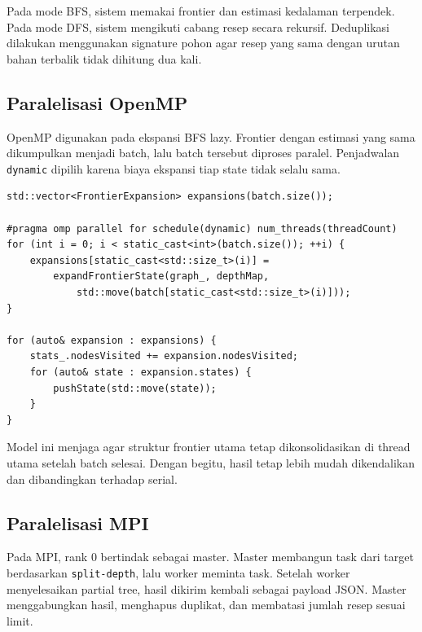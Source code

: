 \documentclass[conference]{IEEEtran}
\begin{document}
Pada mode BFS, sistem memakai frontier dan estimasi kedalaman terpendek. Pada mode DFS, sistem mengikuti cabang resep secara rekursif. Deduplikasi dilakukan menggunakan signature pohon agar resep yang sama dengan urutan bahan terbalik tidak dihitung dua kali.

\subsection{Paralelisasi OpenMP}

OpenMP digunakan pada ekspansi BFS lazy. Frontier dengan estimasi yang sama dikumpulkan menjadi batch, lalu batch tersebut diproses paralel. Penjadwalan \texttt{dynamic} dipilih karena biaya ekspansi tiap state tidak selalu sama.

\begin{lstlisting}[style=cppstyle,caption={Ekspansi batch BFS menggunakan OpenMP.}]
std::vector<FrontierExpansion> expansions(batch.size());

#pragma omp parallel for schedule(dynamic) num_threads(threadCount)
for (int i = 0; i < static_cast<int>(batch.size()); ++i) {
    expansions[static_cast<std::size_t>(i)] =
        expandFrontierState(graph_, depthMap,
            std::move(batch[static_cast<std::size_t>(i)]));
}

for (auto& expansion : expansions) {
    stats_.nodesVisited += expansion.nodesVisited;
    for (auto& state : expansion.states) {
        pushState(std::move(state));
    }
}
\end{lstlisting}

Model ini menjaga agar struktur frontier utama tetap dikonsolidasikan di thread utama setelah batch selesai. Dengan begitu, hasil tetap lebih mudah dikendalikan dan dibandingkan terhadap serial.

\subsection{Paralelisasi MPI}

Pada MPI, rank 0 bertindak sebagai master. Master membangun task dari target berdasarkan \texttt{split-depth}, lalu worker meminta task. Setelah worker menyelesaikan partial tree, hasil dikirim kembali sebagai payload JSON. Master menggabungkan hasil, menghapus duplikat, dan membatasi jumlah resep sesuai limit.
\end{document}
